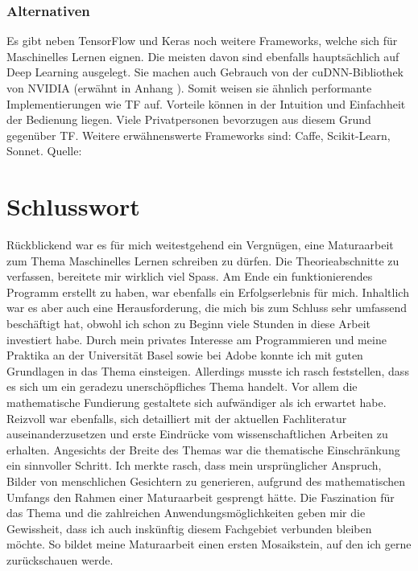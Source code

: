 \subsection*{Alternativen}
Es gibt neben TensorFlow und Keras noch weitere Frameworks, welche sich für
Maschinelles Lernen eignen. Die meisten davon sind ebenfalls hauptsächlich auf Deep
Learning ausgelegt. Sie machen auch Gebrauch von der cuDNN-Bibliothek
von NVIDIA (erwähnt in Anhang ). Somit weisen sie
ähnlich performante Implementierungen wie TF auf. Vorteile können in der
Intuition und Einfachheit der Bedienung liegen. Viele Privatpersonen bevorzugen
aus diesem Grund  gegenüber TF.
Weitere erwähnenswerte Frameworks sind: Caffe, Scikit-Learn, Sonnet.
\para{}
Quelle: \cite{book:hands-on}


\chapter*{Schlusswort}

Rückblickend war es für mich weitestgehend ein Vergnügen, eine Maturaarbeit zum
Thema Maschinelles Lernen schreiben zu dürfen. Die Theorieabschnitte zu
verfassen, bereitete mir wirklich viel Spass. Am Ende ein funktionierendes
Programm erstellt zu haben, war ebenfalls ein Erfolgserlebnis für mich.
Inhaltlich war es aber auch eine Herausforderung, die mich bis
zum Schluss sehr umfassend beschäftigt hat, obwohl ich schon zu Beginn viele
Stunden in diese Arbeit investiert habe. Durch mein privates Interesse am
Programmieren und meine Praktika an der Universität Basel sowie bei Adobe konnte
ich mit guten Grundlagen in das Thema einsteigen. Allerdings musste ich rasch
feststellen, dass es sich um ein geradezu unerschöpfliches Thema handelt. Vor
allem die mathematische Fundierung gestaltete sich aufwändiger als ich erwartet
habe.
\para{}
Reizvoll war ebenfalls, sich detailliert mit der aktuellen Fachliteratur
auseinanderzusetzen und erste Eindrücke vom wissenschaftlichen Arbeiten zu
erhalten. Angesichts der Breite des Themas war die thematische Einschränkung ein
sinnvoller Schritt. Ich merkte rasch, dass mein ursprünglicher Anspruch, Bilder
von menschlichen Gesichtern zu generieren, aufgrund des mathematischen Umfangs
den Rahmen einer Maturaarbeit gesprengt hätte.
\para{}
Die Faszination für das Thema und die zahlreichen
Anwendungsmöglichkeiten geben mir die Gewissheit, dass ich auch inskünftig
diesem Fachgebiet verbunden bleiben möchte. So bildet meine Maturaarbeit einen
ersten Mosaikstein, auf den ich gerne zurückschauen werde.

